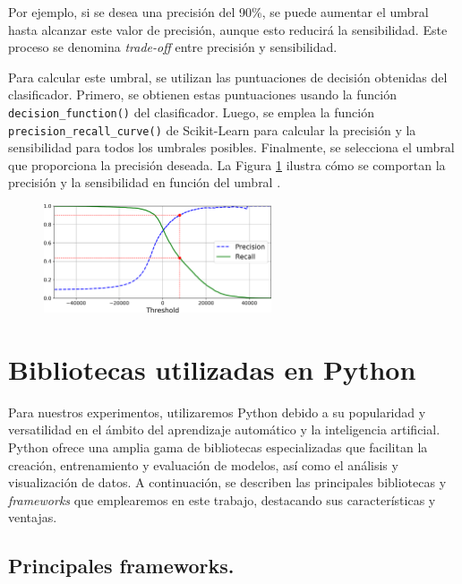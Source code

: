 Por ejemplo, si se desea una precisión del 90\%, se puede aumentar el umbral hasta alcanzar este valor de precisión, aunque esto reducirá la sensibilidad. Este proceso se denomina \textit{trade-off} entre precisión y sensibilidad.

Para calcular este umbral, se utilizan las puntuaciones de decisión obtenidas del clasificador. Primero, se obtienen estas puntuaciones usando la función \lstinline|decision_function()| del clasificador. Luego, se emplea la función \lstinline|precision_recall_curve()| de Scikit-Learn para calcular la precisión y la sensibilidad para todos los umbrales posibles. Finalmente, se selecciona el umbral que proporciona la precisión deseada. La Figura \ref{img: pr_vs_threshold} ilustra cómo se comportan la precisión y la sensibilidad en función del umbral \citep{geron2022hands}.

\begin{figure}[h]
	\centering
    \includegraphics[width=0.6\textwidth]{img/precision_recall_vs_threshold.png}
    \label{img: pr_vs_threshold}
\end{figure}


\section{Bibliotecas utilizadas en Python} \label{Subsec: 3_3}

Para nuestros experimentos, utilizaremos Python debido a su popularidad y versatilidad en el ámbito del aprendizaje automático y la inteligencia artificial. Python ofrece una amplia gama de bibliotecas especializadas que facilitan la creación, entrenamiento y evaluación de modelos, así como el análisis y visualización de datos. A continuación, se describen las principales bibliotecas y \textit{frameworks} que emplearemos en este trabajo, destacando sus características y ventajas.


\subsection{Principales frameworks.}

